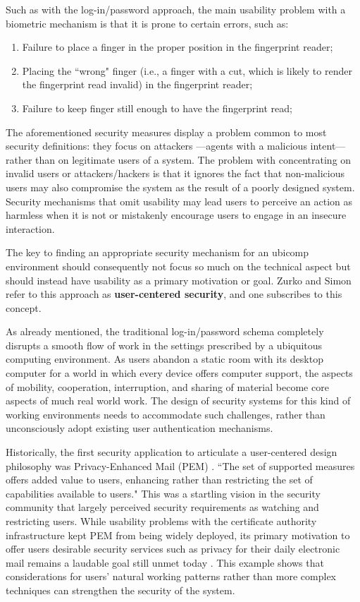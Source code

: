 \documentclass{article}
\begin{document}
Such as with the log-in/password approach, the main usability problem with a biometric mechanism is that it is prone to certain errors, such as:
\begin{enumerate}
\item Failure to place a finger in the proper position in the fingerprint reader;
\item Placing the ``wrong" finger (i.e., a finger with a cut, which is likely to render the fingerprint read invalid) in the fingerprint reader;
\item Failure to keep finger still enough to have the fingerprint read;
\end{enumerate}

The aforementioned security measures display a problem common to most security definitions: they focus on attackers ---agents with a malicious intent--- rather than on legitimate users of a system. The problem with concentrating on invalid users or attackers/hackers is that it ignores the fact that non-malicious users may also compromise the system as the result of a poorly designed system.  Security mechanisms that omit usability may lead users to perceive an action as harmless when it is not or mistakenly encourage users to engage in an insecure interaction. 

The key to finding an appropriate security mechanism for an ubicomp environment should consequently not focus so much on the technical aspect but should instead have usability as a primary motivation or goal.  Zurko and Simon \cite{zurko1996user} refer to this approach as \textbf{user-centered security}, and one subscribes to this concept. 

As already mentioned, the traditional log-in/password schema completely disrupts a smooth flow of work in the settings prescribed by a ubiquitous computing environment. As users abandon a static room with its desktop computer for a world in which every device offers computer support, the aspects of mobility, cooperation, interruption, and sharing of material become core aspects of much real world work. The design of security systems for this kind of working environments needs to accommodate such challenges, rather than unconsciously adopt existing user authentication mechanisms.

Historically, the first security application to articulate a user-centered design philosophy was Privacy-Enhanced Mail (PEM) \cite{linn1993privacy}. ``The set of supported measures offers added value to users, enhancing rather than restricting the set of capabilities available to users." This was a startling vision in the security community that largely perceived security requirements as watching and restricting users. While usability problems with the certificate authority infrastructure kept PEM from being widely deployed, its primary motivation to offer users desirable security services such as privacy for their daily electronic mail remains a laudable goal still  unmet today \cite{zurko1996user}.  This example shows that considerations for users' natural working patterns rather than more complex techniques can strengthen the security of the system.
\end{document}
